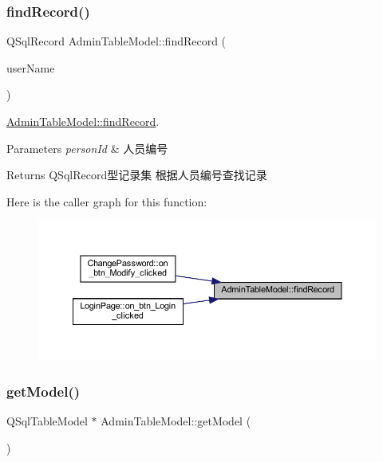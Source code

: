 \subsubsection{\texorpdfstring{findRecord()}{findRecord()}}
{\footnotesize\ttfamily Q\+Sql\+Record Admin\+Table\+Model\+::find\+Record (\begin{DoxyParamCaption}\item[{const Q\+String \&}]{user\+Name }\end{DoxyParamCaption})}



\mbox{\hyperlink{class_admin_table_model_a951c5e298d36e8451a13c63711933b5e}{Admin\+Table\+Model\+::find\+Record}}. 


\begin{DoxyParams}{Parameters}
{\em person\+Id} & 人员编号 \\
\hline
\end{DoxyParams}
\begin{DoxyReturn}{Returns}
Q\+Sql\+Record型记录集 根据人员编号查找记录 
\end{DoxyReturn}
Here is the caller graph for this function\+:
\nopagebreak
\begin{figure}[H]
\begin{center}
\leavevmode
\includegraphics[width=350pt]{class_admin_table_model_a951c5e298d36e8451a13c63711933b5e_icgraph}
\end{center}
\end{figure}
\mbox{\label{class_admin_table_model_a67350532cce04df05f02baf1148d957b}} 
\subsubsection{\texorpdfstring{getModel()}{getModel()}}
{\footnotesize\ttfamily Q\+Sql\+Table\+Model $\ast$ Admin\+Table\+Model\+::get\+Model (\begin{DoxyParamCaption}\item[{void}]{ }\end{DoxyParamCaption})}



